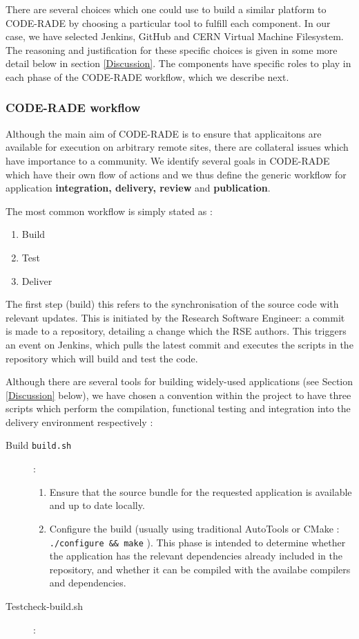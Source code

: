 \documentclass[a4paper]{jpconf}
\begin{document}
	There are several choices  which one could use to build a similar platform to CODE-RADE by choosing a particular tool to fulfill each component. In our case, we have selected Jenkins\cite{Jenkins}, GitHub\cite{Github} and CERN Virtual Machine Filesystem\cite{CVMFS}. The reasoning and justification for these specific choices is given in some more detail below in section \ref{Discussion}. The components have specific roles to play in each phase of the CODE-RADE workflow, which we describe next.

	\subsubsection{CODE-RADE workflow}

	Although the main aim of CODE-RADE is to ensure that applicaitons are available for execution on arbitrary remote sites, there are collateral issues which have importance to a community. We identify several goals in CODE-RADE which have their own flow of actions and we thus define the generic workflow for application {\bf integration, delivery, review} and {\bf publication}.

	The most common workflow is simply stated as :

	\begin{enumerate}
		\item Build
		\item Test
		\item Deliver
	\end{enumerate}

	The first step (build) this refers to the synchronisation of the source code with relevant updates. This is initiated by the Research Software Engineer: a commit is made to a repository, detailing a change which the RSE authors. This triggers an event on Jenkins, which pulls the latest commit and executes the scripts in the repository which will build and test the code.

	Although there are several tools for building widely-used applications (see Section \ref{Discussion} below), we have chosen a convention within the project to have three scripts which perform the compilation, functional testing and integration into the delivery environment respectively :

  \begin{description}
    \item[Build  \texttt{build.sh} ]:
      \begin{enumerate}
        \item Ensure that the source bundle for the requested application is available and up to date locally.
        \item Configure the build (usually using traditional AutoTools \cite{AutoTools} or CMake \cite{CMake} : {\tt ./configure \&\& make} ). This phase is intended to determine whether the application has the relevant dependencies already included in the repository, and whether it can be compiled with the availabe compilers and dependencies.
      \end{enumerate}
    \item[Test{\ttfamily check-build.sh}]:
  \end{description}
\end{document}
